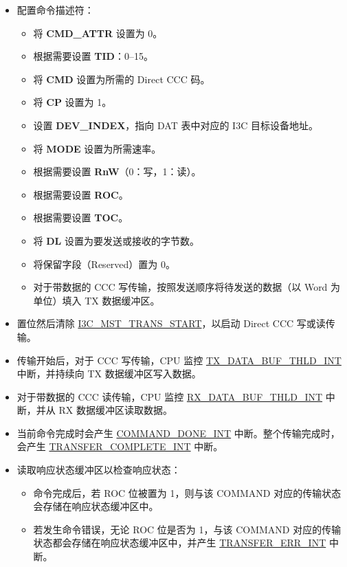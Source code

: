 \documentclass[main\_\_CN.tex]{subfiles}
\begin{document}
\begin{itemize}
    \item 配置命令描述符：
    \begin{itemize}
        \item 将 \textbf{CMD\_ATTR} 设置为 0。
        \item 根据需要设置 \textbf{TID}：0–15。
        \item 将 \textbf{CMD} 设置为所需的 Direct CCC 码。
        \item 将 \textbf{CP} 设置为 1。
        \item 设置 \textbf{DEV\_INDEX}，指向 DAT 表中对应的 I3C 目标设备地址。
        \item 将 \textbf{MODE} 设置为所需速率。
        \item 根据需要设置 \textbf{RnW}（0：写，1：读）。
        \item 根据需要设置 \textbf{ROC}。
        \item 根据需要设置 \textbf{TOC}。
        \item 将 \textbf{DL} 设置为要发送或接收的字节数。
        \item 将保留字段（Reserved）置为 0。
        \item 对于带数据的 CCC 写传输，按照发送顺序将待发送的数据（以 Word 为单位）填入 TX 数据缓冲区。
    \end{itemize}
    \item 置位然后清除 \hyperref[fielddesc:I3CMSTREGTRANSSTART]{I3C\_MST\_TRANS\_START}，以启动 Direct CCC 写或读传输。
    \item 传输开始后，对于 CCC 写传输，CPU 监控 \hyperref[int:TXDATABUFTHLDINT]{TX\_DATA\_BUF\_THLD\_INT} 中断，并持续向 TX 数据缓冲区写入数据。
    \item 对于带数据的 CCC 读传输，CPU 监控 \hyperref[int:RXDATABUFTHLDINT]{RX\_DATA\_BUF\_THLD\_INT} 中断，并从 RX 数据缓冲区读取数据。
    \item 当前命令完成时会产生 \hyperref[int:COMMANDDONEINT]{COMMAND\_DONE\_INT} 中断。整个传输完成时，会产生 \hyperref[int:TRANSFERCOMPLETEINT]{TRANSFER\_COMPLETE\_INT} 中断。
    \item 读取响应状态缓冲区以检查响应状态：
    \begin{itemize}
        \item 命令完成后，若 ROC 位被置为 1，则与该 COMMAND 对应的传输状态会存储在响应状态缓冲区中。
        \item 若发生命令错误，无论 ROC 位是否为 1，与该 COMMAND 对应的传输状态都会存储在响应状态缓冲区中，并产生 \hyperref[int:TRANSFERERRINT]{TRANSFER\_ERR\_INT} 中断。
    \end{itemize}
\end{itemize}
\end{document}
